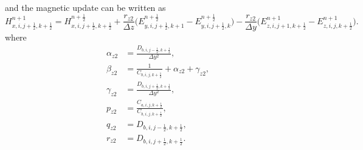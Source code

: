 \documentclass{article}
\numberwithin{equation}{section}
\numberwithin{figure}{section}
\begin{document}
and the magnetic update can be written as
\begin{equation}
    H_{x,i,j+\tfrac12,k+\tfrac12}^{n+1} = H_{x,i,j+\tfrac12,k+\tfrac12}^{n+\frac12} + \frac{r_{z2}}{\Delta z}\Big(E_{y,i,j+\tfrac12,k+1}^{n+\frac12}-E_{y,i,j+\tfrac12,k}^{n+\frac12}\Big) - \frac{r_{z2}}{\Delta y}\Big(E_{z,i,j+1,k+\tfrac12}^{n+1}-E_{z,i,j,k+\tfrac12}^{n+1}\Big).
    \label{eq:adi-second-hx}
\end{equation}
where
\begin{align}
    \alpha_{z2} & =\frac{D_{b,i,j-\tfrac12,k+\tfrac12}}{\Delta y^2},       \\
    \beta_{z2}  & =\frac{1}{C_{b,i,j,k+\tfrac12}}+\alpha_{z2}+\gamma_{z2}, \\
    \gamma_{z2} & =\frac{D_{b,i,j+\tfrac12,k+\tfrac12}}{\Delta y^2},       \\
    p_{z2}      & =\frac{C_{a,i,j,k+\tfrac12}}{C_{b,i,j,k+\tfrac12}},      \\
    q_{z2}      & =D_{b,i,j-\tfrac12,k+\tfrac12},                          \\
    r_{z2}      & =D_{b,i,j+\tfrac12,k+\tfrac12}.
\end{align}
\end{document}
